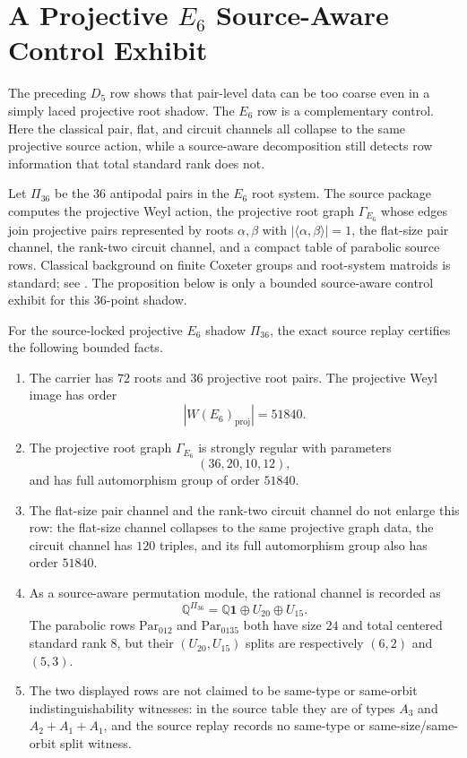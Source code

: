 \section{A Projective \texorpdfstring{\(E_6\)}{E6} Source-Aware Control Exhibit}
\label{sec:e6-root-shadow-control}

The preceding \(D_5\) row shows that pair-level data can be too coarse even in a simply laced projective root shadow.  The \(E_6\) row is a complementary control.  Here the classical pair, flat, and circuit channels all collapse to the same projective source action, while a source-aware decomposition still detects row information that total standard rank does not.

Let \(\Pi_{36}\) be the 36 antipodal pairs in the \(E_6\) root system.  The source package computes the projective Weyl action, the projective root graph \(\Gamma_{E_6}\) whose edges join projective pairs represented by roots \(\alpha,\beta\) with \(|\langle\alpha,\beta\rangle|=1\), the flat-size pair channel, the rank-two circuit channel, and a compact table of parabolic source rows.  Classical background on finite Coxeter groups and root-system matroids is standard; see \cite{BjornerBrenti2005,DutourSikiricFeliksonTumarkin2008RootMatroids}.  The proposition below is only a bounded source-aware control exhibit for this 36-point shadow.

\begin{proposition}
\label{prop:e6-root-shadow-control}
For the source-locked projective \(E_6\) shadow \(\Pi_{36}\), the exact source replay certifies the following bounded facts.
\begin{enumerate}[label=\textup{(\alph*)},leftmargin=*]
  \item The carrier has \(72\) roots and \(36\) projective root pairs.  The projective Weyl image has order
  \[
    |W(E_6)_{\mathrm{proj}}|=51840.
  \]
  \item The projective root graph \(\Gamma_{E_6}\) is strongly regular with parameters
  \[
    (36,20,10,12),
  \]
  and has full automorphism group of order \(51840\).
  \item The flat-size pair channel and the rank-two circuit channel do not enlarge this row: the flat-size channel collapses to the same projective graph data, the circuit channel has \(120\) triples, and its full automorphism group also has order \(51840\).
  \item As a source-aware permutation module, the rational channel is recorded as
  \[
    \mathbb Q^{\Pi_{36}}=\mathbb Q\mathbf 1\oplus U_{20}\oplus U_{15}.
  \]
  The parabolic rows \(\mathrm{Par}_{012}\) and \(\mathrm{Par}_{0135}\) both have size \(24\) and total centered standard rank \(8\), but their \((U_{20},U_{15})\) splits are respectively \((6,2)\) and \((5,3)\).
  \item The two displayed rows are not claimed to be same-type or same-orbit indistinguishability witnesses: in the source table they are of types \(A_3\) and \(A_2+A_1+A_1\), and the source replay records no same-type or same-size/same-orbit split witness.
\end{enumerate}
\end{proposition}

